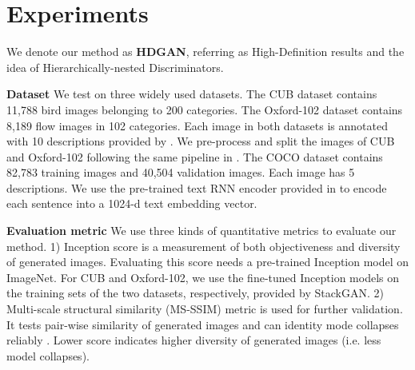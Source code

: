 \documentclass[10pt,twocolumn,letterpaper]{article}
\begin{document}
\section{Experiments}
We denote our method as \textbf{HDGAN}, referring as High-Definition results and the idea of Hierarchically-nested Discriminators.

\textbf{Dataset} 
We test on three widely used datasets. The CUB dataset \cite{welinder2010caltech} contains 11,788 bird images belonging to 200 categories. 
The Oxford-102 dataset \cite{Nilsback08} contains 8,189 flow images in 102 categories. 
Each image in both datasets is annotated with 10 descriptions provided by \cite{reed2016generative}. We pre-process and split the images of CUB and Oxford-102 following the same pipeline in \cite{reed2016generative,han2017stackgan}. The COCO dataset \cite{lin2014microsoft} contains 82,783 training images and 40,504 validation images. Each image has 5 descriptions. 
We use the pre-trained text RNN encoder provided in \cite{reed2016generative} to encode each sentence into a 1024-d text embedding vector.


\textbf{Evaluation metric}
We use three kinds of quantitative metrics to evaluate our method.
1) Inception score \cite{improvedGAN} is a measurement of both objectiveness and diversity of generated images. Evaluating this score needs a pre-trained Inception model on ImageNet. 
For CUB and Oxford-102, we use the fine-tuned Inception models on the training sets of the two datasets, respectively, provided by StackGAN. 
2) Multi-scale structural similarity (MS-SSIM) metric \cite{improvedGAN} is used for further validation. It tests pair-wise similarity of generated images and can identity mode collapses reliably \cite{odena2016conditional}. Lower score indicates higher diversity of generated images (i.e. less model collapses). 
\end{document}
